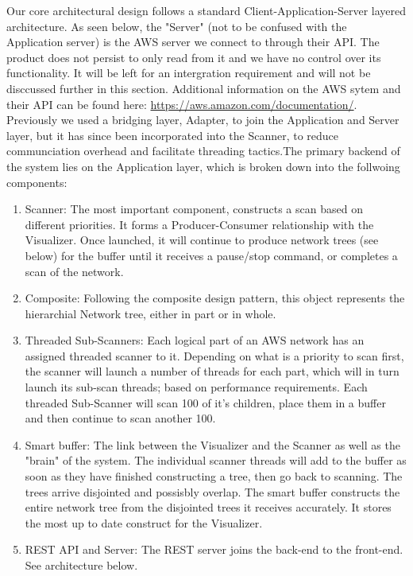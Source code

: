 \documentclass[hidelinks,a4paper,12pt]{article}
\begin{document}
Our core architectural design follows a standard Client-Application-Server layered architecture. As seen below, the "Server" (not to be confused with the Application server) is the AWS server we connect to through their API. The product does not persist to only read from it and we have no control over its functionality. It will be left for an intergration requirement and will not be disccussed further in this section. Additional information on the AWS sytem and their API can be found here: \url{https://aws.amazon.com/documentation/}. Previously we used a  bridging layer, Adapter, to join the Application and Server layer, but  it has since been incorporated into the Scanner, to reduce communciation overhead and facilitate threading tactics.The primary backend of the system lies on the Application layer, which is broken down into the follwoing components:
\begin{enumerate}  
	\item Scanner: The most important component, constructs a scan based on different priorities. It forms a Producer-Consumer relationship with the Visualizer. Once launched, it will continue to produce network trees (see below) for the buffer until it receives a pause/stop command, or completes a scan of the network. 
	\item Composite:  Following the composite design pattern, this object represents the hierarchial Network tree, either in part or in whole.  
	\item Threaded Sub-Scanners: Each logical part of an AWS network has an assigned threaded scanner to it. Depending on what is a priority to scan first, the scanner will launch a number of threads for each part, which will in turn launch its sub-scan threads; based on performance requirements. Each threaded Sub-Scanner will scan 100 of it's children, place them in a buffer and then continue to scan another 100. 
	\item Smart buffer: The link between the Visualizer and the Scanner as well as the "brain" of the system. The individual scanner threads will add to the buffer as soon as they have finished constructing a tree, then go back to scanning. The trees arrive disjointed and possisbly overlap. The smart buffer constructs the entire network tree from the disjointed trees it receives accurately. It stores the most up to date construct for the Visualizer.
	\item REST API and Server: The REST server joins the back-end to the front-end. See architecture below.
\end{enumerate}
\end{document}
